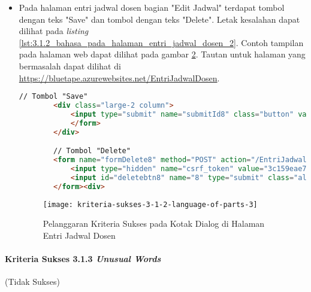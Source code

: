 \begin{itemize}
    \begin{figure}[H]
        \centering  
        \texttt{[image: kriteria-sukses-3-1-2-language-of-parts-2]}  
        \caption[Pelanggaran Kriteria Sukses 3.1.2 pada Halaman Entri Jadwal Dosen]{Pelanggaran Kriteria Sukses 3.1.2 pada Halaman Entri Jadwal Dosen}
        \label{fig:3.1.2_language_of_parts_2}  
    \end{figure}
    
    \item Pada halaman entri jadwal dosen bagian "Edit Jadwal" terdapat tombol dengan teks "Save" dan tombol dengan teks "Delete". Letak kesalahan dapat dilihat pada \textit{listing} \ref{lst:3.1.2_bahasa_pada_halaman_entri_jadwal_dosen_2}. Contoh tampilan pada halaman web dapat dilihat pada gambar \ref{fig:3.1.2_language_of_parts_3}. Tautan untuk halaman yang bermasalah dapat dilihat di \url{https://bluetape.azurewebsites.net/EntriJadwalDosen}.
    \begin{lstlisting}[frame=single, label={lst:3.1.2_bahasa_pada_halaman_entri_jadwal_dosen_2}, language=HTML, caption=Pelanggaran Kriteria Sukses 3.1.2 pada Kotak Dialog di Halaman Entri Jadwal Dosen]
        // Tombol "Save"
        <div class="large-2 column">
            <input type="submit" name="submitId8" class="button" value="Save">
            </form>
        </div>

        // Tombol "Delete"
        <form name="formDelete8" method="POST" action="/EntriJadwalDosen/delete/8">    
            <input type="hidden" name="csrf_token" value="3c159eae7bc953dd591b679c080ed066"/>
            <input id="deletebtn8" name="8" type="submit" class="alert button" value="Delete">
        </form><div>
    \end{lstlisting}
    
    \begin{figure}[H]
        \centering  
        \texttt{[image: kriteria-sukses-3-1-2-language-of-parts-3]}  
        \caption[Pelanggaran Kriteria Sukses 3.1.2 pada Kotak Dialog di Halaman Entri Jadwal Dosen]{Pelanggaran Kriteria Sukses pada Kotak Dialog di Halaman Entri Jadwal Dosen}
        \label{fig:3.1.2_language_of_parts_3}  
    \end{figure}
\end{itemize}

\paragraph{Kriteria Sukses 3.1.3 \textit{Unusual Words}}
\label{par:kepatuhan_bluetape_kriteria_sukses_3.1.3}
(Tidak Sukses)\\

